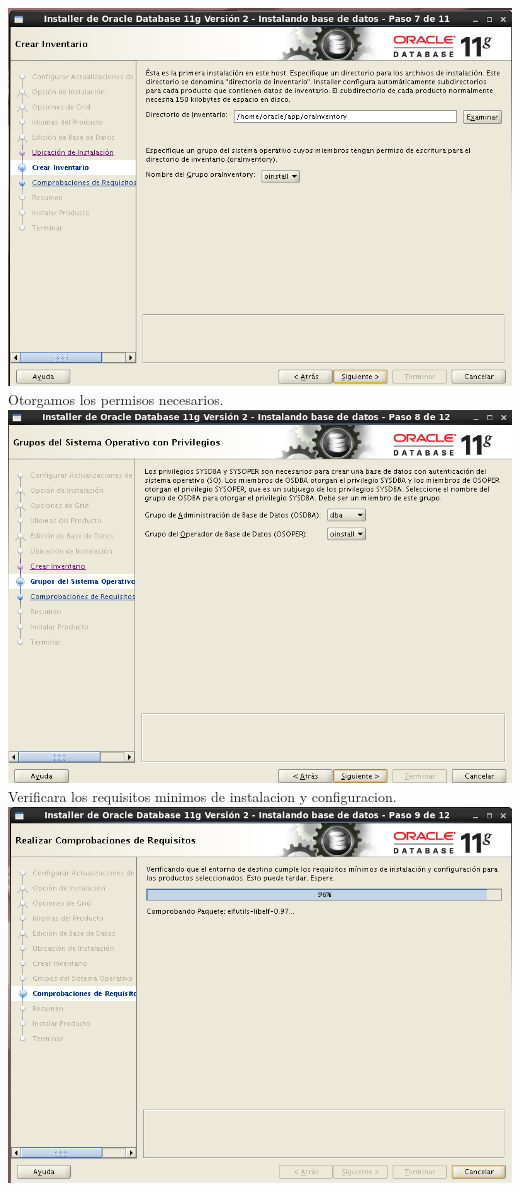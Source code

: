 \documentclass[12pt,letterpaper]{article}
\begin{document}
\begin{center}
\includegraphics[width=15cm]{./oraclelinux/18.png}\\
Otorgamos los permisos necesarios.\\
\includegraphics[width=15cm]{./oraclelinux/19.png}\\
Verificara los requisitos minimos de instalacion y configuracion.\\
\includegraphics[width=15cm]{./oraclelinux/20.png}\\

\end{center}
\end{document}
